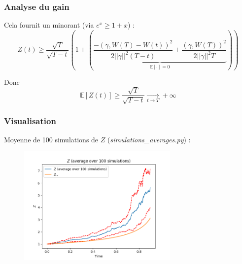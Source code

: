 \documentclass{beamer}
\begin{document}
\begin{frame}
\frametitle{Analyse du gain}

\par Cela fournit un minorant (via $e^x \geq 1 + x$) :
\begin{displaymath}
Z \left( t \right) \geq  \frac{\sqrt{T}}{\sqrt{T - t}} \left( 1 + \left( \underbrace{\frac{- \left( \gamma, W \left( T \right) - W \left( t \right) \right)^2}{2 ||\gamma||^2 \left( T - t \right)} + \frac{\left( \gamma, W \left( T \right) \right)^2}{2 ||\gamma||^2 T }}_{\mathbb{E} \left[ \cdot \right] = 0} \right) \right)
\end{displaymath}

\par Donc
\begin{displaymath}
\mathbb{E} \left[ Z \left( t \right) \right] \geq  \frac{\sqrt{T}}{\sqrt{T - t}} \xrightarrow[t \to T]{} + \infty
\end{displaymath}
\end{frame}

\begin{frame}
\frametitle{Visualisation}
\par Moyenne de 100 simulations de $Z$ (\emph{simulations\_averages.py}) : 
\begin{figure}[H]
  \centering
    \includegraphics[width=0.7\textwidth]{images/average_100.png}
  \caption{}
\end{figure}
\end{frame}
\end{document}
